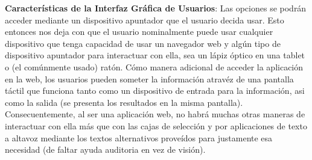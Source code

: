 \textbf{Características de la Interfaz Gráfica de Usuarios}: Las opciones se podrán acceder mediante un dispositivo apuntador que el usuario decida usar. Esto entonces nos deja con que el usuario nominalmente puede usar cualquier dispositivo que tenga capacidad de usar un navegador web y algún tipo de dispositivo apuntador para interactuar con ella, sea un lápiz óptico en una tablet o (el comúnmente usado) ratón. Cómo manera adicional de acceder la aplicación en la web, los usuarios pueden someter la información atravéz de una pantalla táctil que funciona tanto como un dispositivo de entrada para la información, asi como la salida (se presenta los resultados en la misma pantalla). Consecuentemente, al ser una aplicación web, no habrá muchas otras maneras de interactuar con ella más que con las cajas de selección y por aplicaciones de texto a altavoz mediante los textos alternativos proveídos para justamente esa necesidad (de faltar ayuda auditoria en vez de visión).